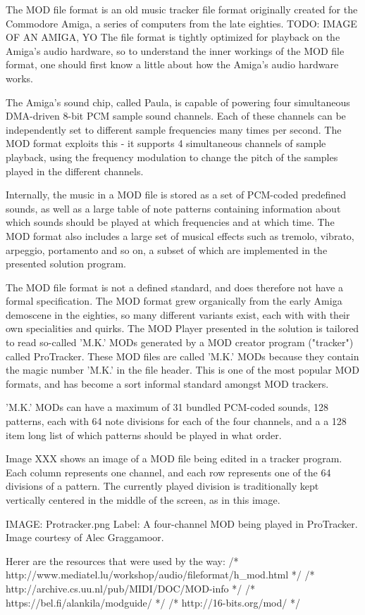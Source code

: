 
The MOD file format is an old music tracker file format originally created for the Commodore Amiga, a series of computers from the late eighties. TODO: IMAGE OF AN AMIGA, YO
The file format is tightly optimized for playback on the Amiga's audio hardware, so to understand the inner workings of the MOD file format, one should first know a little about how the Amiga's audio hardware works.

The Amiga's sound chip, called Paula, is capable of powering four simultaneous DMA-driven 8-bit PCM sample sound channels.
Each of these channels can be independently set to different sample frequencies many times per second.
The MOD format exploits this - it supports 4 simultaneous channels of sample playback, using the frequency modulation to change the pitch of the samples played in the different channels.

Internally, the music in a MOD file is stored as a set of PCM-coded predefined sounds, as well as a large table of note patterns containing information about which sounds should be played at which frequencies and at which time.
The MOD format also includes a large set of musical effects such as tremolo, vibrato, arpeggio, portamento and so on, a subset of which are implemented in the presented solution program.

The MOD file format is not a defined standard, and does therefore not have a formal specification.
The MOD format grew organically from the early Amiga demoscene in the eighties, so many different variants exist, each with with their own specialities and quirks.
The MOD Player presented in the solution is tailored to read so-called 'M.K.' MODs generated by a MOD creator program ("tracker") called ProTracker.
These MOD files are called 'M.K.' MODs because they contain the magic number 'M.K.' in the file header.
This is one of the most popular MOD formats, and has become a sort informal standard amongst MOD trackers.

'M.K.' MODs can have a maximum of 31 bundled PCM-coded sounds, 128 patterns, each with 64 note divisions for each of the four channels, and a a 128 item long list of which patterns should be played in what order.

Image XXX shows an image of a MOD file being edited in a tracker program.
Each column represents one channel, and each row represents one of the 64 divisions of a pattern.
The currently played division is traditionally kept vertically centered in the middle of the screen, as in this image.




IMAGE: Protracker.png
Label: A four-channel MOD being played in ProTracker. Image courtesy of Alec Graggamoor.


Herer are the resources that were used by the way:
/* http://www.mediatel.lu/workshop/audio/fileformat/h_mod.html */
/* http://archive.cs.uu.nl/pub/MIDI/DOC/MOD-info */
/* https://bel.fi/alankila/modguide/ */
/* http://16-bits.org/mod/ */

